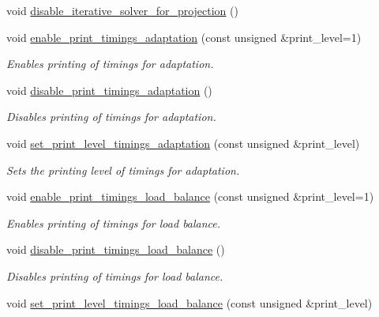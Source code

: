\begin{DoxyCompactItemize}
\item 
void \hyperlink{classoomph_1_1RefineableTriangleMesh_a081ddf29176d5599c6af173f73dd4a8d}{disable\+\_\+iterative\+\_\+solver\+\_\+for\+\_\+projection} ()
\item 
void \hyperlink{classoomph_1_1RefineableTriangleMesh_a53f7ac7fbe9fdde0fb52b634d7370221}{enable\+\_\+print\+\_\+timings\+\_\+adaptation} (const unsigned \&print\+\_\+level=1)
\begin{DoxyCompactList}\small\item\em Enables printing of timings for adaptation. \end{DoxyCompactList}\item 
void \hyperlink{classoomph_1_1RefineableTriangleMesh_aa4c245df63f0fe2feb82bf2bf05e65ef}{disable\+\_\+print\+\_\+timings\+\_\+adaptation} ()
\begin{DoxyCompactList}\small\item\em Disables printing of timings for adaptation. \end{DoxyCompactList}\item 
void \hyperlink{classoomph_1_1RefineableTriangleMesh_a3580283bfa7acd135e294051890c62a4}{set\+\_\+print\+\_\+level\+\_\+timings\+\_\+adaptation} (const unsigned \&print\+\_\+level)
\begin{DoxyCompactList}\small\item\em Sets the printing level of timings for adaptation. \end{DoxyCompactList}\item 
void \hyperlink{classoomph_1_1RefineableTriangleMesh_a262467b16b4d2749230e9ace5649b8cf}{enable\+\_\+print\+\_\+timings\+\_\+load\+\_\+balance} (const unsigned \&print\+\_\+level=1)
\begin{DoxyCompactList}\small\item\em Enables printing of timings for load balance. \end{DoxyCompactList}\item 
void \hyperlink{classoomph_1_1RefineableTriangleMesh_a380e00a99cdcbdf262e1ebfc1af30007}{disable\+\_\+print\+\_\+timings\+\_\+load\+\_\+balance} ()
\begin{DoxyCompactList}\small\item\em Disables printing of timings for load balance. \end{DoxyCompactList}\item 
void \hyperlink{classoomph_1_1RefineableTriangleMesh_a1bde786a756e1a076df48fe11b8640f9}{set\+\_\+print\+\_\+level\+\_\+timings\+\_\+load\+\_\+balance} (const unsigned \&print\+\_\+level)

\end{DoxyCompactItemize}
